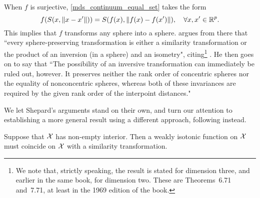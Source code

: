 \documentclass[twoside, 11pt]{article}
\begin{document}
When $f$ is surjective, \eqref{mds_continuum_equal_set} takes the form
\begin{equation}\label{f_shepard}
f(S(x, \|x-x'\|)) = S(f(x), \|f(x)-f(x')\|), \quad \forall x,x' \in \mathbb{R}^p.
\end{equation}
This implies that $f$ transforms any sphere into a sphere.
\citet{shepard1966metric} argues from there that ``every sphere-preserving transformation is either a similarity transformation or the product of an inversion (in a sphere) and an isometry", citing\footnote{We note that, strictly speaking, the result is stated for dimension three, and earlier in the same book, for dimension two. These are Theorems~6.71 and~7.71, at least in the 1969 edition of the book.} \cite[p 104]{coxeter1961introduction}.
He then goes on to say that ``The possibility of an inversive transformation can immediately be ruled out, however. It preserves neither the rank order of concentric spheres nor the equality of nonconcentric spheres, whereas both of these invariances are required by the given rank order of the interpoint distances." 

\medskip
We let Shepard's arguments stand on their own, and turn our attention to establishing a more general result using a different approach, following \cite{arias2017some} instead.

\begin{theorem}
\label{thm:mds}
Suppose that $\mathcal{X}$ has non-empty interior. Then a weakly isotonic function on $\mathcal{X}$ must coincide on $\mathcal{X}$ with a similarity transformation.
\end{theorem}
\end{document}
